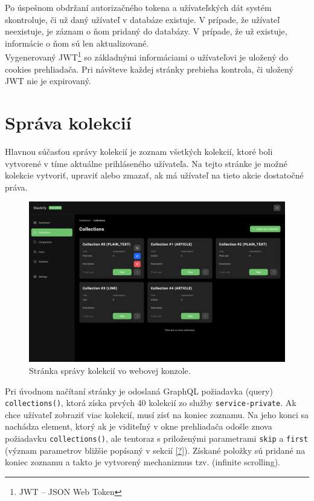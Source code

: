 \noindent Po úspešnom obdržaní autorizačného tokena a užívateľských dát systém skontroluje, či už daný užívateľ v databáze existuje. V prípade, že užívateľ neexistuje, je záznam o ňom pridaný do databázy. V prípade, že už existuje, informácie o ňom sú len aktualizované. \\

\noindent Vygenerovaný JWT\footnote{JWT -- JSON Web Token} so základnými informáciami o užívateľovi je uložený do cookies prehliadača. Pri návšteve každej stránky prebieha kontrola, či uložený JWT nie je expirovaný.

\section{Správa kolekcií}
Hlavnou súčasťou správy kolekcií je zoznam všetkých kolekcií, ktoré boli vytvorené v tíme aktuálne prihláseného užívateľa. Na tejto stránke je možné kolekcie vytvoriť, upraviť alebo zmazať, ak má užívateľ na tieto akcie dostatočné práva.

\begin{figure}[h]
	\centering
	\includegraphics[scale=0.085]{obrazky-figures/screenshot_collections}
	\caption{Stránka správy kolekcií vo webovej konzole.}
\end{figure}

\noindent Pri úvodnom načítaní stránky je odoslaná GraphQL požiadavka (query) \texttt{collections()}, ktorá získa prvých 40 kolekcií zo služby \texttt{service-private}. Ak chce užívateľ zobraziť viac kolekcií, musí zísť na koniec zoznamu. Na jeho konci sa nachádza element, ktorý ak je viditeľný v okne prehliadača odošle znova požiadavku \texttt{collections()}, ale tentoraz s priloženými parametrami \texttt{skip} a \texttt{first} (význam parametrov bližšie popísaný v sekcií \ref{?}). Získané položky sú pridané na koniec zoznamu a takto je vytvorený mechanizmus tzv.  (infinite scrolling).

